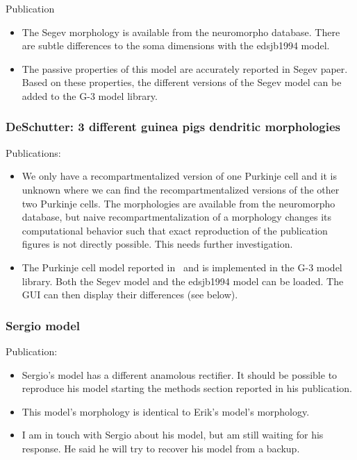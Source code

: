 \documentclass[12pt]{article}
\begin{document}
Publication~\cite{Rapp-P:1994qf}

\begin{itemize}
\item The Segev morphology is available from the
  neuromorpho database.  There are subtle differences to the soma
  dimensions with the edsjb1994 model.
\item The passive properties of this model are accurately reported in
  Segev paper.  Based on these properties, the different versions of
  the Segev model can be added to the G-3 model library.
\end{itemize}


\subsubsection{DeSchutter: 3 different guinea pigs dendritic
  morphologies}

Publications:~\cite{deschutter94:_purkin_i}\cite{deschutter94:_purkin_ii}

\begin{itemize}
\item We only have a recompartmentalized version of one Purkinje cell
  and it is unknown where we can find the recompartmentalized versions
  of the other two Purkinje cells.  The morphologies are available
  from the neuromorpho database, but naive recompartmentalization of a
  morphology changes its computational behavior such that exact
  reproduction of the publication figures is not directly possible.
  This needs further investigation.
\item The Purkinje cell model reported
  in~\cite{deschutter94:_purkin_i} and \cite{deschutter94:_purkin_ii}
  is implemented in the G-3 model library.  Both the Segev model and
  the edsjb1994 model can be loaded.  The GUI can then display their
  differences (see below).
\end{itemize}


\subsubsection{Sergio model}

Publication:~\cite{solinas06:_dendr_purkin}

\begin{itemize}
\item Sergio's model has a different anamolous rectifier.  It should
  be possible to reproduce his model starting the methods section
  reported in his publication.
\item This model's morphology is identical to Erik's model's
  morphology.
\item I am in touch with Sergio about his model, but am still waiting
  for his response.  He said he will try to recover his model from a
  backup.
\end{itemize}
\end{document}

